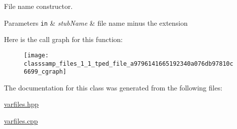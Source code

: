 File name constructor. 


\begin{DoxyParams}[1]{Parameters}
\mbox{\tt in}  & {\em stub\+Name} & file name minus the extension \\
\hline
\end{DoxyParams}
Here is the call graph for this function\+:\nopagebreak
\begin{figure}[H]
\begin{center}
\leavevmode
\texttt{[image: classsamp\_files\_1\_1\_tped\_file\_a9796141665192340a076db97810c6699\_cgraph]}
\end{center}
\end{figure}


The documentation for this class was generated from the following files\+:\begin{DoxyCompactItemize}
\item 
\hyperlink{varfiles_8hpp}{varfiles.\+hpp}\item 
\hyperlink{varfiles_8cpp}{varfiles.\+cpp}\end{DoxyCompactItemize}
